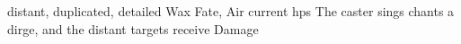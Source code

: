   {distant, duplicated, detailed}%
  {Wax}%
  {Fate, Air}%
  {current \glspl{hp}}%
  {The caster sings chants a dirge, and the distant targets receive  Damage}%
  {}
